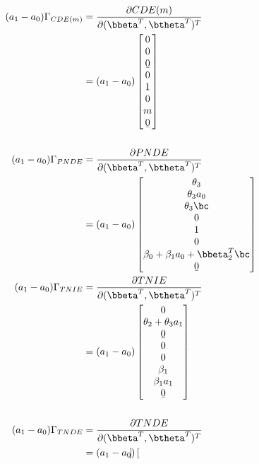 \documentclass[dvipdfmx,10pt]{article}
\begin{document}
\begin{align*}
  (a_{1}-a_{0})\Gamma_{CDE(m)}
  &= \frac{\partial CDE(m)}{\partial (\bbeta^{T},\btheta^{T})^{T}}\\
  &= (a_{1}-a_{0})
    \begin{bmatrix}
      0\\
      0\\
      \b0\\
      0\\
      1\\
      0\\
      m\\
      \b0\\
    \end{bmatrix}\\
  \\
  (a_{1}-a_{0})\Gamma_{PNDE}
  &= \frac{\partial PNDE}{\partial (\bbeta^{T},\btheta^{T})^{T}}\\
  &= (a_{1}-a_{0})
    \begin{bmatrix}
      \theta_{3}\\
      \theta_{3}a_{0}\\
      \theta_{3}\bc\\
      0\\
      1\\
      0\\
      \beta_{0} + \beta_{1}a_{0} + \bbeta_{2}^{T}\bc\\
      \b0\\
    \end{bmatrix}\\
  (a_{1}-a_{0})\Gamma_{TNIE}
  &= \frac{\partial TNIE}{\partial (\bbeta^{T},\btheta^{T})^{T}}\\
  &= (a_{1}-a_{0})
    \begin{bmatrix}
      0\\
      \theta_{2} + \theta_{3}a_{1}\\
      \b0\\
      0\\
      0\\
      \beta_{1}\\
      \beta_{1}a_{1}\\
      \b0\\
    \end{bmatrix}\\
  \\
  (a_{1}-a_{0})\Gamma_{TNDE}
  &= \frac{\partial TNDE}{\partial (\bbeta^{T},\btheta^{T})^{T}}\\
  &= (a_{1}-a_{0})
    \begin{bmatrix}

\end{bmatrix}
\end{align*}
\end{document}

